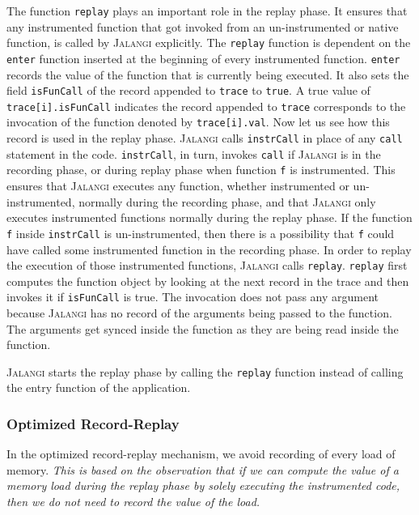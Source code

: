\documentclass{sig-alternate}
\def\jalangi{\textsc{Jalangi}}
\begin{document}
The function \texttt{replay} plays an important role in the replay
phase.  It ensures that any instrumented function that got invoked
from an un-instrumented or native function, is called by \jalangi{}
explicitly.  The \texttt{replay} function is dependent on the
\texttt{enter} function inserted at the beginning of every
instrumented function.  \texttt{enter} records the value of the
function that is currently being executed.  It also sets the field
\texttt{isFunCall} of the record appended to \texttt{trace} to
\texttt{true}.  A true value of \texttt{trace[i].isFunCall} indicates
the record appended to \texttt{trace} corresponds to the invocation of
the function denoted by \texttt{trace[i].val}.  Now let us see how
this record is used in the replay phase.  \jalangi{} calls
\texttt{instrCall} in place of any \texttt{call} statement in the
code.  \texttt{instrCall}, in turn, invokes \texttt{call} if
\jalangi{} is in the recording phase, or during replay phase when
function \texttt{f} is instrumented.  This ensures that \jalangi{}
executes any function, whether instrumented or un-instrumented,
normally during the recording phase, and that \jalangi{} only executes
instrumented functions normally during the replay phase. If the
function \texttt{f} inside \texttt{instrCall} is un-instrumented, then
there is a possibility that \texttt{f} could have called some
instrumented function in the recording phase.  In order to replay the
execution of those instrumented functions, \jalangi{} calls
\texttt{replay}.  \texttt{replay} first computes the function object
by looking at the next record in the trace and then invokes it if
\texttt{isFunCall} is true.  The invocation does not pass any argument
because \jalangi{} has no record of the arguments being passed to the
function.  The arguments get synced inside the function as they are
being read inside the function.

\jalangi{} starts the replay phase by calling the \texttt{replay}
function instead of calling the entry function of the application.

\subsubsection{Optimized Record-Replay}
\label{sec:optim-record-repl}

In the optimized record-replay mechanism, we avoid recording of every
load of memory.  \emph{This is based on the observation that if we can
  compute the value of a memory load during the replay phase by solely
  executing the instrumented code, then we do not need to record the
  value of the load.}  %
 
\end{document}
